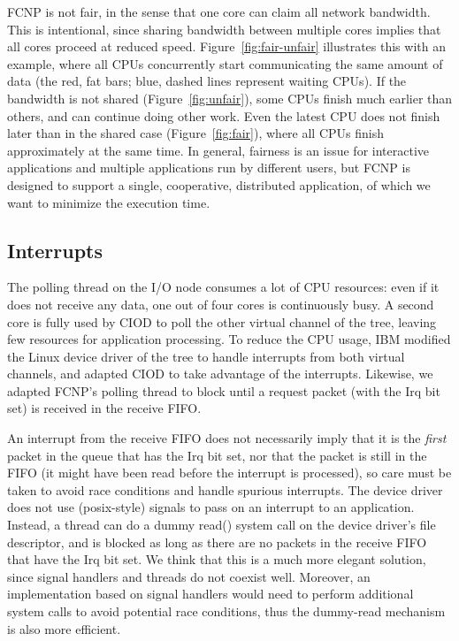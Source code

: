 \documentclass[journal]{IEEEtran}
\begin{document}
FCNP is not fair, in the sense that one core can claim all network bandwidth.
This is intentional, since sharing bandwidth between multiple cores implies
that all cores proceed at reduced speed.
Figure~\ref{fig:fair-unfair} illustrates this with an example, where all
CPUs concurrently start communicating the same amount of data (the red, fat
bars; blue, dashed lines represent waiting CPUs).
If the bandwidth is not shared (Figure~\ref{fig:unfair}), some CPUs finish
much earlier than others, and can continue doing other work.
Even the latest CPU does not finish later than in the shared case
(Figure~\ref{fig:fair}), where all CPUs finish approximately at the same time.
In general, fairness is an issue for interactive applications and multiple
applications run by different users, but FCNP is designed to support a single,
cooperative, distributed application, of which we want to minimize the
execution time.


\subsection{Interrupts}
\label{sec:interrupts}

The polling thread on the I/O node consumes a lot of CPU resources: even if it
does not receive any data, one out of four cores is continuously busy.
A second core is fully used by CIOD to poll the other virtual channel of the
tree, leaving few resources for application processing.
To reduce the CPU usage, IBM modified the Linux device driver of the tree to
handle interrupts from both virtual channels, and adapted CIOD to take
advantage of the interrupts.
Likewise, we adapted FCNP's polling thread to block until a request packet
(with the Irq bit set) is received in the receive FIFO.

An interrupt from the receive FIFO does not necessarily imply that it is the
\emph{first\/} packet in the queue that has the Irq bit set, nor that the
packet is still in the FIFO (it might have been read before the interrupt is
processed), so care must be taken to avoid race conditions and handle spurious
interrupts.
The device driver does not use (posix-style) signals to pass on an interrupt
to an application.
Instead, a thread can do a dummy read() system call on the device driver's
file descriptor, and is blocked as long as there are no packets in the
receive FIFO that have the Irq bit set.
We think that this is a much more elegant solution, since signal handlers and
threads do not coexist well.
Moreover, an implementation based on signal handlers would need to perform
additional system calls to avoid potential race conditions, thus the dummy-read
mechanism is also more efficient.
\end{document}
